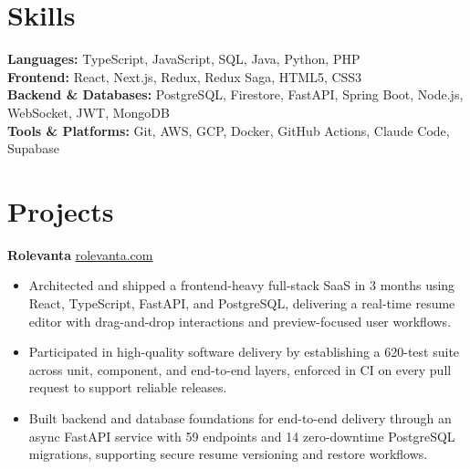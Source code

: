 \documentclass[11pt]{article}       %
\begin{document}
\vspace{-10.5pt}

\section*{Skills}
\textbf{Languages:} TypeScript, JavaScript, SQL, Java, Python, PHP \\
\textbf{Frontend:} React, Next.js, Redux, Redux Saga, HTML5, CSS3 \\
\textbf{Backend \& Databases:} PostgreSQL, Firestore, FastAPI, Spring Boot, Node.js, WebSocket, JWT, MongoDB \\
\textbf{Tools \& Platforms:} Git, AWS, GCP, Docker, GitHub Actions, Claude Code, Supabase
\vspace{-5pt}






\section*{Projects}
\textbf{Rolevanta} \hfill \href{https://rolevanta.com}{rolevanta.com} \\
\vspace{-9pt}
\begin{itemize}
  \item Architected and shipped a frontend-heavy full-stack SaaS in 3 months using React, TypeScript, FastAPI, and PostgreSQL, delivering a real-time resume editor with drag-and-drop interactions and preview-focused user workflows.
  \item Participated in high-quality software delivery by establishing a 620-test suite across unit, component, and end-to-end layers, enforced in CI on every pull request to support reliable releases.
  \item Built backend and database foundations for end-to-end delivery through an async FastAPI service with 59 endpoints and 14 zero-downtime PostgreSQL migrations, supporting secure resume versioning and restore workflows.
\end{itemize}
\end{document}
